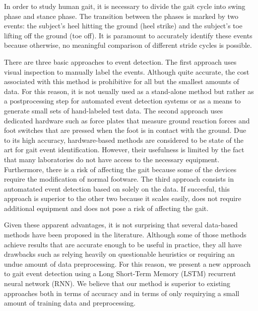 \documentclass{acm_proc_article-sp}
\begin{document}
In order to study human gait,
it is necessary to divide the gait cycle into swing phase and stance phase.
The transition between the phases is marked by two events:
the subject's heel hitting the ground (heel strike) and the subject's toe
lifting off the ground (toe off).
It is paramount to accurately identify these events because otherwise, no
meaningful comparison of different stride cycles is possible.


There are three basic approaches to event detection.
The first approach uses visual inspection to manually label the events.
Although quite accurate, the cost associated with this method is prohibitive for
all but the smallest amounts of data.
For this reason, it is not usually used as a stand-alone method but rather as a
postprocessing step for automated event detection systems or as a means to
generate small sets of hand-labeled test data.
The second approach uses dedicated hardware such as force plates that measure
ground reaction forces and foot switches that are pressed when the foot is in
contact with the ground.
Due to its high accuracy, hardware-based methods are considered to be
state of the art for gait event identification.
However, their usefulness is limited by the fact that many laboratories do not
have access to the necessary equipment.
Furthermore, there is a risk of affecting the gait because some of the devices
require the modification of normal footware.
The third approach consists in automatated event detection based on solely on
the data.
If succesful, this approach is superior to the other two because it scales
easily, does not require additional equipment and does not pose a risk of
affecting the gait.

Given these apparent advantages, it is not surprising that several data-based
methods have been proposed in the literature.
Although some of those methods achieve results that are accurate enough to be
useful in practice, they all have drawbacks such as relying heavily on
questionable heuristics or requiring an undue amount of data preprocessing.
For this reason, we present a new approach to gait event detection using a
Long Short-Term Memory (LSTM) recurrent neural network (RNN).
We believe that our method is superior to existing approaches both in terms of
accuracy and in terms of only requirying a small amount of training data and
preprocessing.

\end{document}
